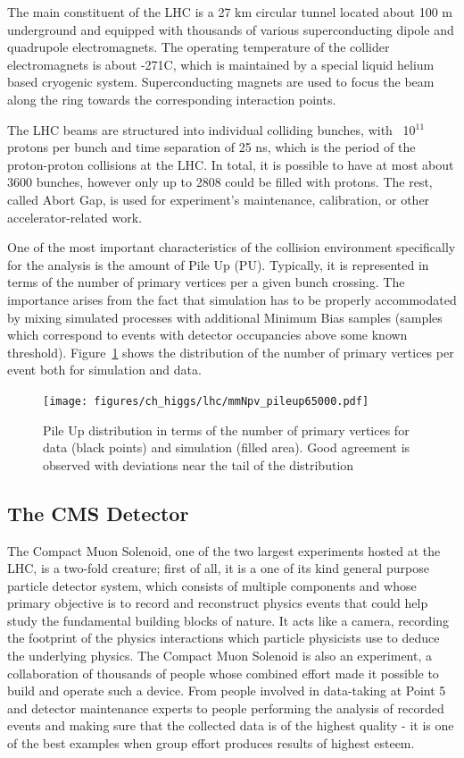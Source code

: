 The main constituent of the LHC is a 27 km circular tunnel located about 100 m underground and equipped with thousands of various superconducting dipole and quadrupole electromagnets. The operating temperature of the collider electromagnets is about -271\textdegree{}C, which is maintained by a special liquid helium based cryogenic system. Superconducting magnets are used to focus the beam along the ring towards the corresponding interaction points.

The LHC beams are structured into individual colliding bunches, with ~10$^{11}$ protons per bunch and time separation of 25 ns, which is the period of the proton-proton collisions at the LHC. In total, it is possible to have at most about 3600 bunches, however only up to 2808 could be filled with protons. The rest, called Abort Gap, is used for experiment's maintenance, calibration, or other accelerator-related work.

One of the most important characteristics of the collision environment specifically for the analysis is the amount of Pile Up (PU). Typically, it is represented in terms of the number of primary vertices per a given bunch crossing. The importance arises from the fact that simulation has to be properly accommodated by mixing simulated processes with additional Minimum Bias samples (samples which correspond to events with detector occupancies above some known threshold). Figure~\ref{fig:higgs_pu} shows the distribution of the number of primary vertices per event both for simulation and data.
\begin{figure}[htbp]
    \centering
    \texttt{[image: figures/ch\_higgs/lhc/mmNpv\_pileup65000.pdf]}
    \caption{Pile Up distribution in terms of the number of primary vertices for data (black points) and simulation (filled area). Good agreement is observed with deviations near the tail of the distribution}
    \label{fig:higgs_pu}
 \end{figure}

\subsection{The CMS Detector} \label{subsection:higgs_cms_generaldescription}
The Compact Muon Solenoid, one of the two largest experiments hosted at the LHC, is a two-fold creature; first of all, it is a one of its kind general purpose particle detector system, which consists of multiple components and whose primary objective is to record and reconstruct physics events that could help study the fundamental building blocks of nature. It acts like a camera, recording the footprint of the physics interactions which particle physicists use to deduce the underlying physics. The Compact Muon Solenoid is also an experiment, a collaboration of thousands of people whose combined effort made it possible to build and operate such a device. From people involved in data-taking at Point 5 and detector maintenance experts to people performing the analysis of recorded events and making sure that the collected data is of the highest quality - it is one of the best examples when group effort produces results of highest esteem.

